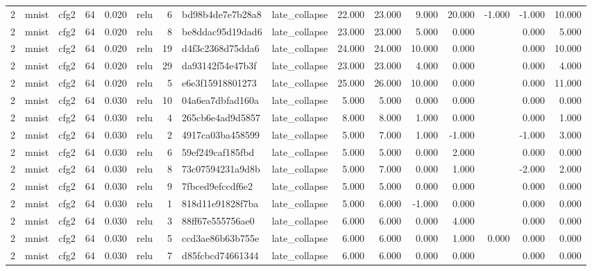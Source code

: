 \begin{table}[htbp]
{\begin{tabular}{@{}rllrrlrllrrrrrrr@{}}
2 & mnist & cfg2 & 64 & 0.020 & relu & 6 & bd98b4de7e7b28a8 & late\_collapse & 22.000 & 23.000 & 9.000 & 20.000 & -1.000 & -1.000 & 10.000 \\
2 & mnist & cfg2 & 64 & 0.020 & relu & 8 & be8ddac95d19dad6 & late\_collapse & 23.000 & 23.000 & 5.000 & 0.000 &  & 0.000 & 5.000 \\
2 & mnist & cfg2 & 64 & 0.020 & relu & 19 & d4f3c2368d75dda6 & late\_collapse & 24.000 & 24.000 & 10.000 & 0.000 &  & 0.000 & 10.000 \\
2 & mnist & cfg2 & 64 & 0.020 & relu & 29 & da93142f54e47b3f & late\_collapse & 23.000 & 23.000 & 4.000 & 0.000 &  & 0.000 & 4.000 \\
2 & mnist & cfg2 & 64 & 0.020 & relu & 5 & e6e3f15918801273 & late\_collapse & 25.000 & 26.000 & 10.000 & 0.000 &  & 0.000 & 11.000 \\
2 & mnist & cfg2 & 64 & 0.030 & relu & 10 & 04a6ea7dbfad160a & late\_collapse & 5.000 & 5.000 & 0.000 & 0.000 &  & 0.000 & 0.000 \\
2 & mnist & cfg2 & 64 & 0.030 & relu & 4 & 265cb6e4ad9d5857 & late\_collapse & 8.000 & 8.000 & 1.000 & 0.000 &  & 0.000 & 1.000 \\
2 & mnist & cfg2 & 64 & 0.030 & relu & 2 & 4917ca03ba458599 & late\_collapse & 5.000 & 7.000 & 1.000 & -1.000 &  & -1.000 & 3.000 \\
2 & mnist & cfg2 & 64 & 0.030 & relu & 6 & 59ef249caf185fbd & late\_collapse & 5.000 & 5.000 & 0.000 & 2.000 &  & 0.000 & 0.000 \\
2 & mnist & cfg2 & 64 & 0.030 & relu & 8 & 73c07594231a9d8b & late\_collapse & 5.000 & 7.000 & 0.000 & 1.000 &  & -2.000 & 2.000 \\
2 & mnist & cfg2 & 64 & 0.030 & relu & 9 & 7fbced9efccdf6e2 & late\_collapse & 5.000 & 5.000 & 0.000 & 0.000 &  & 0.000 & 0.000 \\
2 & mnist & cfg2 & 64 & 0.030 & relu & 1 & 818d11e91828f7ba & late\_collapse & 5.000 & 6.000 & -1.000 & 0.000 &  & 0.000 & 0.000 \\
2 & mnist & cfg2 & 64 & 0.030 & relu & 3 & 88ff67e555756ae0 & late\_collapse & 6.000 & 6.000 & 0.000 & 4.000 &  & 0.000 & 0.000 \\
2 & mnist & cfg2 & 64 & 0.030 & relu & 5 & ccd3ae86b63b755e & late\_collapse & 6.000 & 6.000 & 0.000 & 1.000 & 0.000 & 0.000 & 0.000 \\
2 & mnist & cfg2 & 64 & 0.030 & relu & 7 & d85fcbcd74661344 & late\_collapse & 6.000 & 6.000 & 0.000 & 0.000 &  & 0.000 & 0.000 \\

\end{tabular}}
\end{table}
